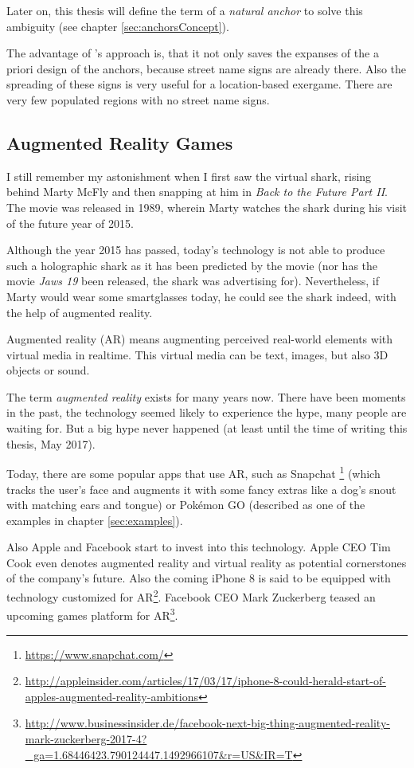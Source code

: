 Later on, this thesis will define the term of a \emph{natural anchor} to solve this ambiguity (see chapter \ref{sec:anchorsConcept}).

The advantage of \citeauthor{hock2014augmented}'s approach is, that it not only saves the expanses of the a priori design of the anchors, because street name signs are already there. Also the spreading of these signs is very useful for a location-based exergame. There are very few populated regions with no street name signs.

\subsection{Augmented Reality Games}\label{sec:augmentedRealityStateOfTheArt}
I still remember my astonishment when I first saw the virtual shark, rising behind Marty McFly and then snapping at him in \emph{Back to the Future Part II}. The movie was released in 1989, wherein Marty watches the shark during his visit of the future year of 2015.

Although the year 2015 has passed, today's technology is not able to produce such a holographic shark as it has been predicted by the movie (nor has the movie \emph{Jaws 19} been released, the shark was advertising for).
Nevertheless, if Marty would wear some smartglasses today, he could see the shark indeed, with the help of augmented reality.

Augmented reality (AR) means augmenting perceived real-world elements with virtual media in realtime. This virtual media can be text, images, but also 3D objects or sound.

The term \emph{augmented reality} exists for many years now. There have been moments in the past, the technology seemed likely to experience the hype, many people are waiting for. But a big hype never happened (at least until the time of writing this thesis, May 2017).

Today, there are some popular apps that use AR, such as Snapchat \footnote{\url{https://www.snapchat.com/}} (which tracks the user's face and augments it with some fancy extras like a dog's snout with matching ears and tongue) or Pok\'{e}mon GO (described as one of the examples in chapter \ref{sec:examples}).

Also Apple and Facebook start to invest into this technology. Apple CEO Tim Cook even denotes augmented reality and virtual reality as potential cornerstones of the company's future. Also the coming iPhone 8 is said to be equipped with technology customized for AR\footnote{\url{http://appleinsider.com/articles/17/03/17/iphone-8-could-herald-start-of-apples-augmented-reality-ambitions}}. Facebook CEO Mark Zuckerberg teased an upcoming games platform for AR\footnote{\url{http://www.businessinsider.de/facebook-next-big-thing-augmented-reality-mark-zuckerberg-2017-4?_ga=1.68446423.790124447.1492966107&r=US&IR=T}}.

